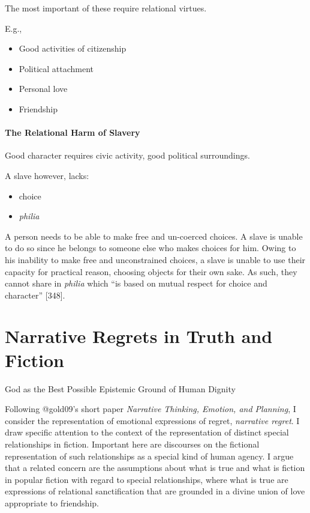 \documentclass[
  letterpaper,
  DIV=11,
  numbers=noendperiod]{scrreprt}
\providecommand{\tightlist}{%
  \setlength{\itemsep}{0pt}\setlength{\parskip}{0pt}}\usepackage{longtable,booktabs,array}
\begin{document}
\begin{tcolorbox}[enhanced jigsaw, arc=.35mm, breakable, rightrule=.15mm, colback=white, colframe=quarto-callout-important-color-frame, bottomrule=.15mm, leftrule=.75mm, opacityback=0, toprule=.15mm, left=2mm]
\begin{tcolorbox}[enhanced jigsaw, arc=.35mm, breakable, rightrule=.15mm, colback=white, colframe=quarto-callout-tip-color-frame, bottomrule=.15mm, leftrule=.75mm, opacityback=0, toprule=.15mm, left=2mm]
The most important of these require relational virtues.

E.g.,

\begin{itemize}
\tightlist
\item
  Good activities of citizenship
\item
  Political attachment
\item
  Personal love
\item
  Friendship
\end{itemize}

\subsubsection{The Relational Harm of
Slavery}\label{the-relational-harm-of-slavery-1}

Good character requires civic activity, good political surroundings.

A slave however, lacks:

\begin{itemize}
\tightlist
\item
  choice
\item
  \emph{philia}
\end{itemize}

A person needs to be able to make free and un-coerced choices. A slave
is unable to do so since he belongs to someone else who makes choices
for him. Owing to his inability to make free and unconstrained choices,
a slave is unable to use their capacity for practical reason, choosing
objects for their own sake. As such, they cannot share in \emph{philia}
which ``is based on mutual respect for choice and character'' {[}348{]}.

\chapter{Narrative Regrets in Truth and
Fiction}\label{narrative-regrets-in-truth-and-fiction}

God as the Best Possible Epistemic Ground of Human Dignity

Following @gold09's short paper \emph{Narrative Thinking, Emotion, and
Planning}, I consider the representation of emotional expressions of
regret, \emph{narrative regret}. I draw specific attention to the
context of the representation of distinct special relationships in
fiction. Important here are discourses on the fictional representation
of such relationships as a special kind of human agency. I argue that a
related concern are the assumptions about what is true and what is
fiction in popular fiction with regard to special relationships, where
what is true are expressions of relational sanctification that are
grounded in a divine union of love appropriate to friendship.


\end{tcolorbox}
\end{tcolorbox}
\end{document}
